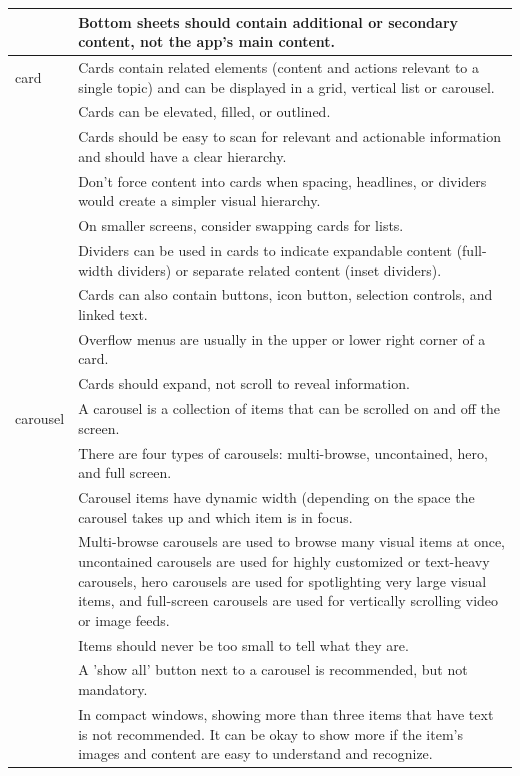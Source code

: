 \documentclass[11pt,titlepage,oneside,openany]{book}
\begin{document}
\begin{longtable}{|p{}|p{}|}
	~ & Bottom sheets should contain additional or secondary content, not the app's main content. \\ \hline
	card & Cards contain related elements (content and actions relevant to a single topic) and can be displayed in a grid, vertical list or carousel. \\ 
	~ & Cards can be elevated, filled, or outlined. \\ 
	~ & Cards should be easy to scan for relevant and actionable information and should have a clear hierarchy. \\ 
	~ & Don't force content into cards when spacing, headlines, or dividers would create a simpler visual hierarchy. \\ 
	~ & On smaller screens, consider swapping cards for lists. \\ 
	~ & Dividers can be used in cards to indicate expandable content (full-width dividers) or separate related content (inset dividers). \\ 
	~ & Cards can also contain buttons, icon button, selection controls, and linked text. \\ 
	~ & Overflow menus are usually in the upper or lower right corner of a card. \\ 
	~ & Cards should expand, not scroll to reveal information. \\ \hline
	carousel & A carousel is a collection of items that can be scrolled on and off the screen. \\ 
	~ & There are four types of carousels: multi-browse, uncontained, hero, and full screen. \\ 
	~ & Carousel items have dynamic width (depending on the space the carousel takes up and which item is in focus. \\ 
	~ & Multi-browse carousels are used to browse many visual items at once, uncontained carousels are used for highly customized or text-heavy carousels, hero carousels are used for spotlighting very large visual items, and full-screen carousels are used for vertically scrolling video or image feeds. \\ 
	~ & Items should never be too small to tell what they are. \\ 
	~ & A 'show all' button next to a carousel is recommended, but not mandatory. \\ 
	~ & In compact windows, showing more than three items that have text is not recommended. It can be okay to show more if the item's images and content are easy to understand and recognize. \\ 

\end{longtable}
\end{document}
